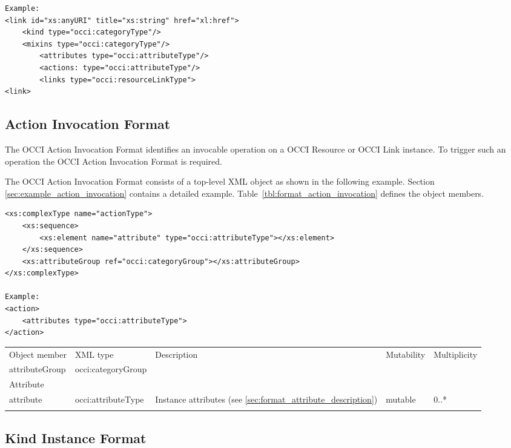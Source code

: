 \documentclass[10pt,a4paper]{article}
\begin{document}
\begin{lstlisting}
Example:
<link id="xs:anyURI" title="xs:string" href="xl:href">
	<kind type="occi:categoryType"/>
	<mixins type="occi:categoryType"/>
        <attributes type="occi:attributeType"/>
        <actions: type="occi:attributeType"/>
        <links type="occi:resourceLinkType">
<link>
\end{lstlisting}

\subsection{Action Invocation Format}
\label{sec:format_action_invocation}

The OCCI Action Invocation  Format identifies an invocable operation on a OCCI Resource or
OCCI Link instance. To trigger such an operation the OCCI Action Invocation
Format is required.

The OCCI Action Invocation Format consists of a top-level XML object as shown in the
following example. Section \ref{sec:example_action_invocation} contains a detailed example.
Table~\ref{tbl:format_action_invocation} defines the object members.
\begin{lstlisting}
<xs:complexType name="actionType">
	<xs:sequence>
		<xs:element name="attribute" type="occi:attributeType"></xs:element>
	</xs:sequence>
	<xs:attributeGroup ref="occi:categoryGroup"></xs:attributeGroup>
</xs:complexType>

Example:
<action>
	<attributes type="occi:attributeType">
</action>
\end{lstlisting}

 {
    \begin{tabularx}{\textwidth}{llXll}
    \toprule
    Object member & XML type & Description & Mutability & Multiplicity \\
    \colrule
    attributeGroup & occi:categoryGroup & & &  \\

    Attribute \\
    attribute & occi:attributeType & Instance attributes (see
\ref{sec:format_attribute_description}) & mutable & 0..* \\
    \botrule
    \end{tabularx}
}

\subsection{Kind Instance Format}
\label{sec:format_kind}
\end{document}
